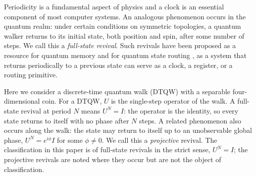 Periodicity is a fundamental aspect of physics and a clock is an
essential component of most computer systems. An analogous phenomenon
occurs in the quantum realm: under certain conditions on symmetric
topologies, a quantum walker returns to its initial state, both
position and spin, after some number of steps. We call this a
\emph{full-state revival}. Such revivals have been proposed as a
resource for quantum memory \cite{Chandrashekar2015} and for quantum
state routing \cite{Steinfurth2025}, as a system that returns
periodically to a previous state can serve as a clock, a register, or
a routing primitive.

Here we consider a discrete-time quantum walk (DTQW) with a separable
four-dimensional coin. For a DTQW, $U$ is the single-step operator of
the walk. A full-state revival at period $N$ means $U^N = I$: the
operator is the identity, so every state returns to itself with no
phase after $N$ steps. A related phenomenon also occurs along the
walk: the state may return to itself up to an unobservable global
phase, $U^N = e^{i\phi} I$ for some $\phi \neq 0$. We call this a
\emph{projective} revival. The classification in this paper is of
full-state revivals in the strict sense, $U^N = I$; the projective
revivals are noted where they occur but are not the object of
classification.
